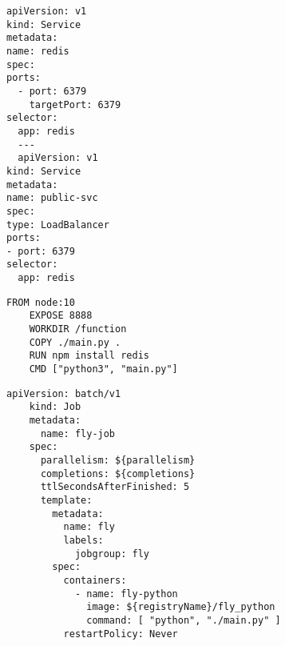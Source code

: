 \begin{lstlisting}[language=FLY,caption={File di configurazione per il servizio Redis}, label={lst:k8s}]
  apiVersion: v1
kind: Service
metadata:
name: redis
spec:
ports:
  - port: 6379
    targetPort: 6379
selector:
  app: redis
  ---
  apiVersion: v1
kind: Service
metadata:
name: public-svc
spec:
type: LoadBalancer
ports:
- port: 6379
selector:
  app: redis

\end{lstlisting}

\begin{lstlisting}[language=FLY,caption={Dockerfile}, label={lst:k8s}]
    FROM node:10
    EXPOSE 8888
    WORKDIR /function
    COPY ./main.py .
    RUN npm install redis
    CMD ["python3", "main.py"]
\end{lstlisting}

\begin{lstlisting}[language=FLY,caption={File di Deployment}, label={lst:k8s}]
    apiVersion: batch/v1
    kind: Job
    metadata:
      name: fly-job
    spec:
      parallelism: ${parallelism}
      completions: ${completions}
      ttlSecondsAfterFinished: 5
      template:
        metadata:
          name: fly
          labels:
            jobgroup: fly
        spec:
          containers:
            - name: fly-python
              image: ${registryName}/fly_python
              command: [ "python", "./main.py" ]
          restartPolicy: Never
\end{lstlisting}